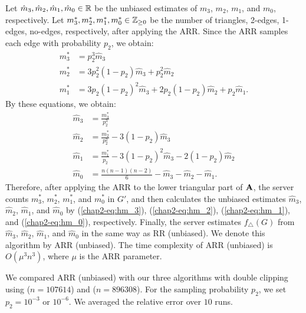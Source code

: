 Let $\hat{m}_3, \hat{m}_2, \hat{m}_1, \hat{m}_0 \in \mathbb{R}$ be the unbiased estimates of $m_3$, $m_2$, $m_1$, and $m_0$, respectively. 
Let $m_3^*, m_2^*, m_1^*, m_0^* \in \mathbb{Z}_{\ge0}$ be the number of triangles, 2-edges, 1-edges, no-edges, respectively, after applying the ARR.
Since the ARR samples each edge with probability $p_2$, we obtain:
\begin{align*}
    m_3^* &= \textstyle{p_2^3 \hat{m}_3} \\
    m_2^* &= \textstyle{3p_2^2(1-p_2) \hat{m}_3 + p_2^2 \hat{m}_2} \\
    m_1^* &= \textstyle{3p_2(1-p_2)^2 \hat{m}_3 + 2p_2(1-p_2) \hat{m}_2 + p_2 \hat{m}_1.}
\end{align*}
By these equations,
we obtain:
\begin{align}
    \hat{m}_3 &= \textstyle{\frac{m_3^*}{p_2^3}} \label{chap2-eq:hm_3} \\
    \hat{m}_2 &= \textstyle{\frac{m_2^*}{p_2^2} - 3(1-p_2)\hat{m}_3} \label{chap2-eq:hm_2} \\
    \hat{m}_1 &= \textstyle{\frac{m_1^*}{p_2} - 3(1-p_2)^2\hat{m}_3 - 2(1-p_2)\hat{m}_2} \label{chap2-eq:hm_1} \\
    \hat{m}_0 &= \textstyle{\frac{n(n-1)(n-2)}{6} - \hat{m}_3 - \hat{m}_2 - \hat{m}_1.} \label{chap2-eq:hm_0}
\end{align}
Therefore, after applying the ARR to the lower triangular part of $\mathbf{A}$, the server counts $m_3^*$, $m_2^*$, $m_1^*$, and $m_0^*$ in $G'$, and then calculates the unbiased estimates $\hat{m}_3$, $\hat{m}_2$, $\hat{m}_1$, and $\hat{m}_0$ by (\ref{chap2-eq:hm_3}), (\ref{chap2-eq:hm_2}), (\ref{chap2-eq:hm_1}), and (\ref{chap2-eq:hm_0}), respectively.
Finally, the server estimates $f_\triangle(G)$ from $\hat{m}_3$, $\hat{m}_2$, $\hat{m}_1$, and $\hat{m}_0$ in the same way as \textsf{RR (unbiased)}.
We denote this algorithm by \textsf{ARR (unbiased)}.
The time complexity of \textsf{ARR (unbiased)} is $O(\mu^3 n^3)$, where $\mu$ is the ARR parameter.

We compared \textsf{ARR (unbiased)} with our three algorithms with double clipping using \GPlus{} ($n=107614$) and \IMDB{} ($n=896308$).
For the sampling probability $p_2$, we set $p_2 = 10^{-3}$ or $10^{-6}$.
We averaged the relative error over $10$ runs.

